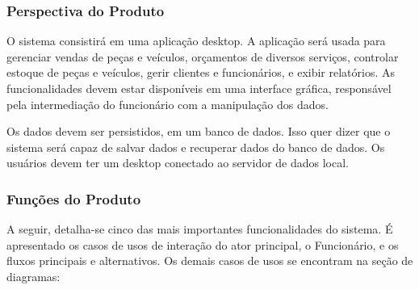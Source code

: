 	\subsubsection{Perspectiva do Produto}
	\par
	O sistema consistirá em uma aplicação  desktop. A aplicação  será usada para gerenciar vendas de peças e veículos, orçamentos de diversos serviços,  controlar estoque de peças e veículos, gerir clientes e funcionários, e exibir  relatórios. As funcionalidades devem estar disponíveis em uma interface gráfica, responsável pela intermediação do funcionário com a manipulação dos dados. 
	\par
	Os dados devem ser persistidos, em um banco de dados. Isso quer dizer que o sistema será capaz de salvar dados e recuperar dados do banco de dados. Os usuários devem ter um desktop conectado  ao servidor de dados local. 
	
	
	\subsubsection{Funções do Produto}
	A seguir, detalha-se cinco das mais importantes funcionalidades do sistema. É apresentado os casos de usos de interação do ator principal, o Funcionário, e os fluxos principais e alternativos. Os demais casos de usos se encontram na seção de diagramas:
	\vspace{12px}
	
